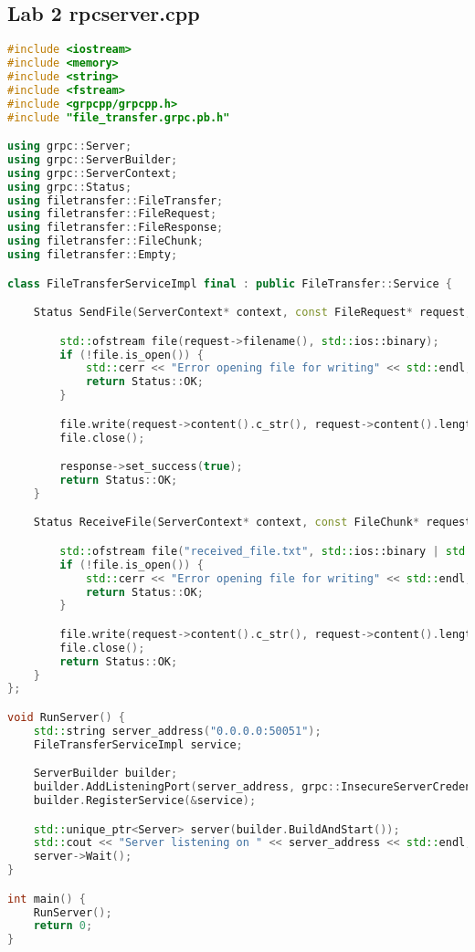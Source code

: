 \documentclass{article}
\begin{document}
\subsection{Lab 2 rpcserver.cpp}

\begin{lstlisting}[language=C++, caption=Sever C++ Code, label=lst:code]
#include <iostream>
#include <memory>
#include <string>
#include <fstream>
#include <grpcpp/grpcpp.h>
#include "file_transfer.grpc.pb.h"

using grpc::Server;
using grpc::ServerBuilder;
using grpc::ServerContext;
using grpc::Status;
using filetransfer::FileTransfer;
using filetransfer::FileRequest;
using filetransfer::FileResponse;
using filetransfer::FileChunk;
using filetransfer::Empty;

class FileTransferServiceImpl final : public FileTransfer::Service {

    Status SendFile(ServerContext* context, const FileRequest* request, FileResponse* response) override {

        std::ofstream file(request->filename(), std::ios::binary);
        if (!file.is_open()) {
            std::cerr << "Error opening file for writing" << std::endl;
            return Status::OK;
        }

        file.write(request->content().c_str(), request->content().length());
        file.close();

        response->set_success(true);
        return Status::OK;
    }

    Status ReceiveFile(ServerContext* context, const FileChunk* request, Empty* response) override {

        std::ofstream file("received_file.txt", std::ios::binary | std::ios::app);
        if (!file.is_open()) {
            std::cerr << "Error opening file for writing" << std::endl;
            return Status::OK;
        }

        file.write(request->content().c_str(), request->content().length());
        file.close();
        return Status::OK;
    }
};

void RunServer() {
    std::string server_address("0.0.0.0:50051");
    FileTransferServiceImpl service;

    ServerBuilder builder;
    builder.AddListeningPort(server_address, grpc::InsecureServerCredentials());
    builder.RegisterService(&service);

    std::unique_ptr<Server> server(builder.BuildAndStart());
    std::cout << "Server listening on " << server_address << std::endl;
    server->Wait();
}

int main() {
    RunServer();
    return 0;
}
\end{lstlisting}
\end{document}
